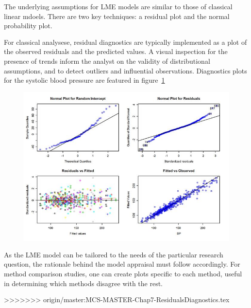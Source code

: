 \documentclass[12pt, a4paper]{report}
\theoremstyle{plain}
\theoremstyle{definition}
\theoremstyle{remark}
\begin{document}
The underlying assumptions for LME models are similar to those of classical linear mdoels. There are two key techniques: a residual plot and the normal probability plot.

For classical analysese, residual diagnostics are typically implemented as a plot of the observed residuals and the predicted values. A visual inspection for the presence of trends inform the analyst on the validity of distributional assumptions, and to detect outliers and influential observations. Diagnostics plots for the systolic blood pressure are featured in figure~\ref{fig:ResidPlot}
	
\begin{figure}[h!]
	\centering
	\includegraphics[width=0.9\linewidth]{images/ResidPlot}
	\caption{}
	\label{fig:ResidPlot}
\end{figure}

As the LME model can be tailored to the needs of the particular research question, the rationale behind the model appraisal must follow accordingly. 
For method comparison studies, one can create plots specific to each method, useful in determining which methods disagree with the rest.
 	
%	
>>>>>>> origin/master:MCS-MASTER-Chap7-ResidualsDiagnostics.tex
\end{document}
